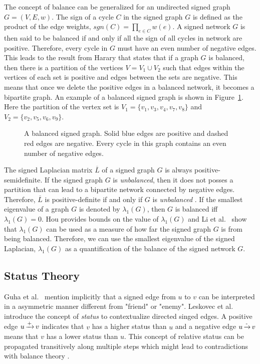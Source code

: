 The concept of balance can be generalized for an undirected signed graph $G=(V,E,w)$.
The sign of a cycle $C$ in the signed graph $G$ is defined as the product of the edge weights, $sgn(C)=\prod_{e\in C}w(e)$.
A signed network $G$ is then said to be balanced if and only if all the sign of all cycles in network are positive.
Therefore, every cycle in $G$ must have an even number of negative edges.
This leads to the result from Harary \cite{harary1953on} that states that if a graph $G$ is balanced, then there is a partition of the vertices $V = V_1 \cup V_2$ such that edges within the vertices of each set is positive and edges between the sets are negative.
This means that once we delete the positive edges in a balanced network, it becomes a bipartite graph.
An example of a balanced signed graph is shown in Figure~\ref{fig:balanced-graph}.
Here the partition of the vertex set is $V_1 = \{v_1,v_3,v_4,v_7,v_8\}$ and $V_2 = \{v_2,v_5,v_6,v_9\}$.

\begin{figure}[!ht]
    \centering
    
    \caption{ A balanced signed graph. Solid blue edges are positive and dashed red edges are negative. Every cycle in this graph contains an even number of negative edges.}
    \label{fig:balanced-graph}
\end{figure}

The signed Laplacian matrix $\overline{L}$ of a signed graph $G$ is always positive-semidefinite.
If the signed graph $G$ is \textit{unbalanced}, then it does not posses a partition that can lead to a bipartite network connected by negative edges.
Therefore, $\overline{L}$ is positive-definite if and only if $G$ is \textit{unbalanced} \cite{kunegis2010spectral,hou2005bounds,zaslavsky1982signed}.
If the smallest eigenvalue of a graph $G$ is denoted by $\lambda_{1}(G)$, then $G$ is balanced iff $\lambda_{1}(G)=0$.
Hou \cite{hou2005bounds} provides bounds on the value of $\lambda_{1}(G)$ and Li et al.\ \cite{li2016note} show that $\lambda_{1}(G)$ can be used as a measure of how far the signed graph $G$ is from being balanced. 
Therefore, we can use the smallest eigenvalue of the signed Laplacian, $\lambda_{1}(G)$ as a quantification of the balance of the signed network $G$.

\subsection{Status Theory}
\label{sec:status-theory}
Guha et al.\ \cite{guha2004propagation} mention implicitly that a signed edge from $u$ to $v$ can be interpreted in a asymmetric manner different from "friend" or "enemy".
Leskovec et al.\ \cite{leskovec2010signed,leskovec2010predicting} introduce the concept of \textit{status} to contextualize directed singed edges.
A positive edge $u \operatorname*{\xrightarrow{+}} v$ indicates that $v$ has a higher status than $u$ and a negative edge $u \operatorname*{\xrightarrow{-}} v$ means that $v$ has a lower status than $u$.
This concept of relative status can be propagated transitively along multiple steps which might lead to contradictions with balance theory \cite{leskovec2010signed}.

